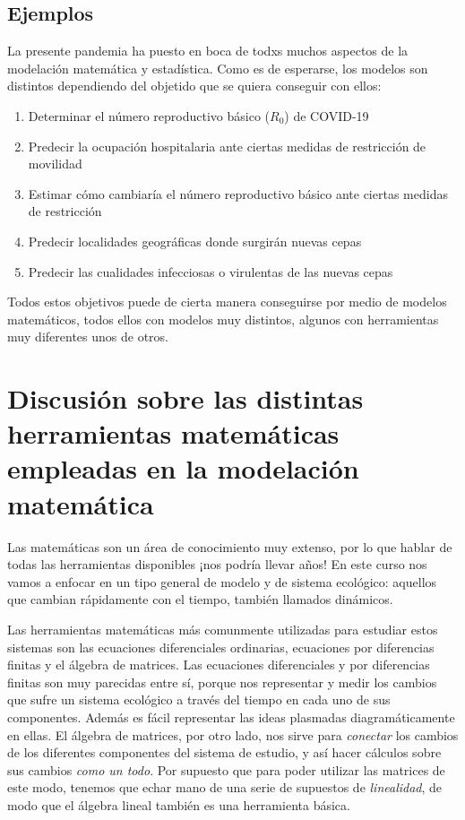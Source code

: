 \documentclass[
]{book}
\providecommand{\tightlist}{%
  \setlength{\itemsep}{0pt}\setlength{\parskip}{0pt}}
\begin{document}
\hypertarget{ejemplos}{%
\subsection{Ejemplos}\label{ejemplos}}

La presente pandemia ha puesto en boca de todxs muchos aspectos de la modelación matemática y estadística. Como es de esperarse, los modelos son distintos dependiendo del objetido que se quiera conseguir con ellos:

\begin{enumerate}
\def\labelenumi{\arabic{enumi}.}
\tightlist
\item
  Determinar el número reproductivo básico (\(R_0\)) de COVID-19
\item
  Predecir la ocupación hospitalaria ante ciertas medidas de restricción de movilidad
\item
  Estimar cómo cambiaría el número reproductivo básico ante ciertas medidas de restricción
\item
  Predecir localidades geográficas donde surgirán nuevas cepas
\item
  Predecir las cualidades infecciosas o virulentas de las nuevas cepas
\end{enumerate}

Todos estos objetivos puede de cierta manera conseguirse por medio de modelos matemáticos, todos ellos con modelos muy distintos, algunos con herramientas muy diferentes unos de otros.

\hypertarget{discusiuxf3n-sobre-las-distintas-herramientas-matemuxe1ticas-empleadas-en-la-modelaciuxf3n-matemuxe1tica}{%
\section{Discusión sobre las distintas herramientas matemáticas empleadas en la modelación matemática}\label{discusiuxf3n-sobre-las-distintas-herramientas-matemuxe1ticas-empleadas-en-la-modelaciuxf3n-matemuxe1tica}}

Las matemáticas son un área de conocimiento muy extenso, por lo que hablar de todas las herramientas disponibles ¡nos podría llevar años! En este curso nos vamos a enfocar en un tipo general de modelo y de sistema ecológico: aquellos que cambian rápidamente con el tiempo, también llamados dinámicos.

Las herramientas matemáticas más comunmente utilizadas para estudiar estos sistemas son las ecuaciones diferenciales ordinarias, ecuaciones por diferencias finitas y el álgebra de matrices. Las ecuaciones diferenciales y por diferencias finitas son muy parecidas entre sí, porque nos representar y medir los cambios que sufre un sistema ecológico a través del tiempo en cada uno de sus componentes. Además es fácil representar las ideas plasmadas diagramáticamente en ellas. El álgebra de matrices, por otro lado, nos sirve para \emph{conectar} los cambios de los diferentes componentes del sistema de estudio, y así hacer cálculos sobre sus cambios \emph{como un todo}. Por supuesto que para poder utilizar las matrices de este modo, tenemos que echar mano de una serie de supuestos de \emph{linealidad}, de modo que el álgebra lineal también es una herramienta básica.
\end{document}
